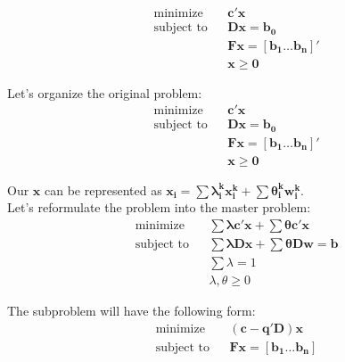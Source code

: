 \documentclass{article}
\begin{document}
\noindent
\begin{equation*}
\begin{aligned}
& \text{minimize} && \mathbf{c'x} \\
& \text{subject to} && \mathbf{Dx = b_0}\\
& &&  \mathbf{Fx = [b_1 \ldots b_n]'} \\
&&& \mathbf{x \geq 0}
\end{aligned}
\end{equation*}

\pagebreak
\noindent
Let's organize the original problem: \\
\begin{equation*}
\begin{aligned}
& \text{minimize} && \mathbf{c'x} \\
& \text{subject to} && \mathbf{Dx = b_0}\\
& &&  \mathbf{Fx = [b_1 \ldots b_n]'} \\
&&& \mathbf{x \geq 0}
\end{aligned}
\end{equation*}

\noindent
Our $\mathbf{x}$ can be represented as $\mathbf{x_i = \sum \lambda_i^k x_i^k + \sum \theta_i^k w_i^k}$. \\

\noindent
Let's reformulate the problem into the master problem: \\

\begin{equation*}
\begin{aligned}
& \text{minimize} && \mathbf{\sum \lambda c'x + \sum \theta c'x} \\
& \text{subject to} && \mathbf{\sum \lambda Dx + \sum \theta Dw= b}\\
&&& \sum \lambda = 1 \\
&&& \lambda, \theta \geq 0
\end{aligned}
\end{equation*}

\noindent
The subproblem will have the following form: \\
\begin{equation*}
\begin{aligned}
& \text{minimize} && \mathbf{(c - q'D)x} \\
& \text{subject to} && \mathbf{Fx = [b_1 \dots b_n]}\\
\end{aligned}
\end{equation*}
\end{document}
